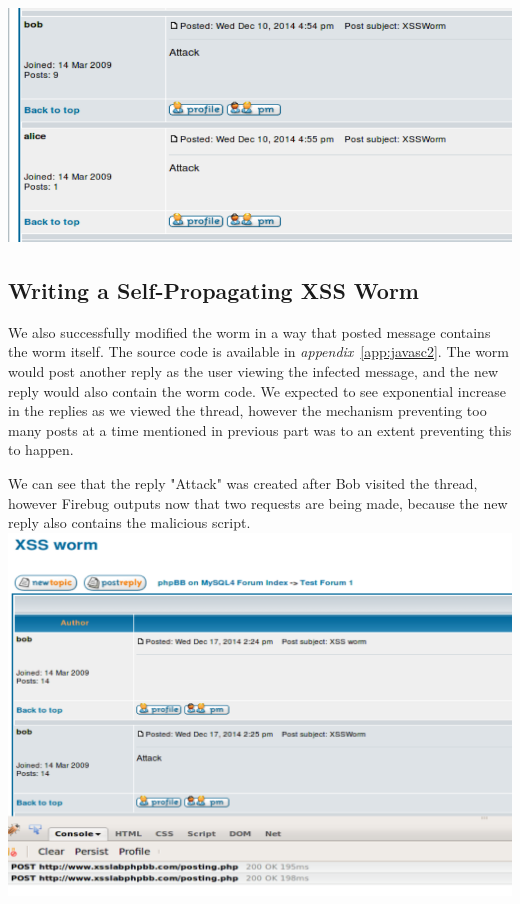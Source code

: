 \documentclass[12pt, a4paper]{article}
\begin{document}
\includegraphics[width=.95\textwidth]{gfx/xss/task5-worm-working}

\subsection{Writing a Self-Propagating XSS Worm}
We also successfully modified the worm in a way that posted message contains the worm itself. The source code is available in \emph{appendix}~\ref{app:javasc2}.
The worm would post another reply as the user viewing the infected message, and the new reply would also contain the worm code. We expected to see exponential increase in the replies as we viewed the thread, however the mechanism preventing too many posts at a time mentioned in previous part was to an extent preventing this to happen.

We can see that the reply "Attack" was created after Bob visited the thread, however Firebug outputs now that two requests are being made, because the new reply also contains the malicious script.\\
\includegraphics[width=.95\textwidth]{gfx/xss/task6}
\end{document}
